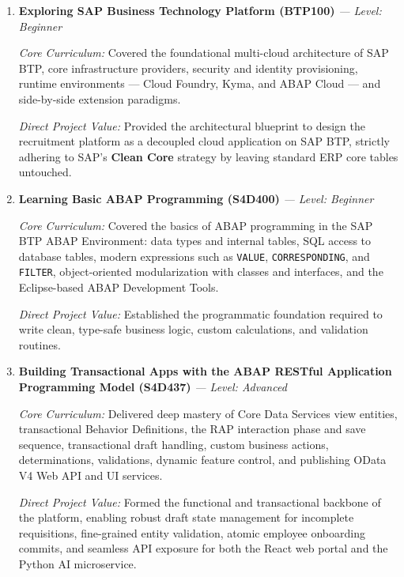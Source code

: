 \begin{enumerate}

    \item \textbf{Exploring SAP Business Technology Platform (BTP100)} \textit{--- Level: Beginner}

    \textit{Core Curriculum:} Covered the foundational multi-cloud architecture of SAP BTP, core infrastructure providers, security and identity provisioning, runtime environments --- Cloud Foundry, Kyma, and ABAP Cloud --- and side-by-side extension paradigms.

    \textit{Direct Project Value:} Provided the architectural blueprint to design the recruitment platform as a decoupled cloud application on SAP BTP, strictly adhering to SAP's \textbf{Clean Core} strategy by leaving standard ERP core tables untouched.

    \item \textbf{Learning Basic ABAP Programming (S4D400)} \textit{--- Level: Beginner}

    \textit{Core Curriculum:} Covered the basics of ABAP programming in the SAP BTP ABAP Environment: data types and internal tables, SQL access to database tables, modern expressions such as \texttt{VALUE}, \texttt{CORRESPONDING}, and \texttt{FILTER}, object-oriented modularization with classes and interfaces, and the Eclipse-based ABAP Development Tools.

    \textit{Direct Project Value:} Established the programmatic foundation required to write clean, type-safe business logic, custom calculations, and validation routines.

    \item \textbf{Building Transactional Apps with the ABAP RESTful Application Programming Model (S4D437)} \textit{--- Level: Advanced}

    \textit{Core Curriculum:} Delivered deep mastery of Core Data Services view entities, transactional Behavior Definitions, the RAP interaction phase and save sequence, transactional draft handling, custom business actions, determinations, validations, dynamic feature control, and publishing OData V4 Web API and UI services.

    \textit{Direct Project Value:} Formed the functional and transactional backbone of the platform, enabling robust draft state management for incomplete requisitions, fine-grained entity validation, atomic employee onboarding commits, and seamless API exposure for both the React web portal and the Python AI microservice.


\end{enumerate}
